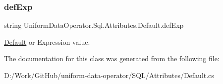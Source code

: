 \subsubsection{\texorpdfstring{def\+Exp}{defExp}}
{\footnotesize\ttfamily string Uniform\+Data\+Operator.\+Sql.\+Attributes.\+Default.\+def\+Exp}



\mbox{\hyperlink{class_uniform_data_operator_1_1_sql_1_1_attributes_1_1_default}{Default}} or Expression value. 



The documentation for this class was generated from the following file\+:\begin{DoxyCompactItemize}
\item 
D\+:/\+Work/\+Git\+Hub/uniform-\/data-\/operator/\+S\+Q\+L/\+Attributes/Default.\+cs\end{DoxyCompactItemize}
